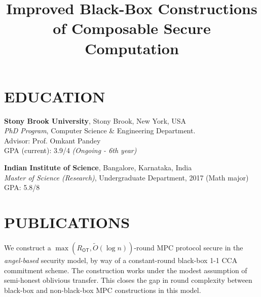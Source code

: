 \documentclass[margin]{res}
\begin{document}
\begin{resume}

\section{EDUCATION}

\textbf{Stony Brook University}, Stony Brook, New York, USA\\
{\sl PhD Program}, Computer Science \& Engineering Department. \\ Advisor: Prof. Omkant Pandey \\ GPA (current): 3.9/4
\textit{(Ongoing - 6th year)}

\textbf{Indian Institute of Science}, Bangalore, Karnataka, India\\
{\sl Master of Science (Research)}, Undergraduate Department, 2017 (Math major)\hfill \newline
GPA: 5.8/8



\section{PUBLICATIONS}

\location{}
\title{\textbf{Improved Black-Box Constructions of Composable Secure Computation}}
\begin{position}
We construct a $\max(R_\mathsf{OT},\widetilde{O}(\log n))$-round  MPC protocol secure in the {\em angel-based} security model, by way of a constant-round black-box 1-1 CCA commitment scheme. The construction works under the modest assumption of semi-honest oblivious transfer. This closes the gap in round complexity between black-box and non-black-box MPC constructions in this model. 
\end{position}


\end{resume}
\end{document}
